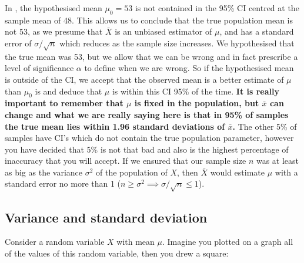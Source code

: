 In , the hypothesised mean $\mu_0=53$ is not contained in the 95\% CI centred at the sample mean of 48. This allows us to conclude that the true population mean is not 53, as we presume that $\bar{X}$ is an unbiased estimator of $\mu$, and has a standard error of $\sigma/\sqrt{n}$ which reduces as the sample size increases. We hypothesised that the true mean was 53, but we allow that we can be wrong and in fact prescribe a level of significance $\alpha$ to define when we are wrong. So if the hypothesised mean is outside of the CI, we accept that the observed mean is a better estimate of $\mu$ than $\mu_0$ is and deduce that $\mu$ is within this CI 95\% of the time. \textbf{It is really important to remember that $\mu$ is fixed in the population, but $\bar{x}$ can change and what we are really saying here is that in 95\% of samples the true mean lies within 1.96 standard deviations of $\bar{x}$.} The other 5\% of samples have CI's which do not contain the true population parameter, however you have decided that 5\% is not that bad and also is the highest percentage of inaccuracy that you will accept. If we ensured that our sample size $n$ was at least as big as the variance $\sigma^2$ of the population of $X$, then $\bar{X}$ would estimate $\mu$ with a standard error no more than 1 ($n \geq \sigma^2 \implies \sigma/\sqrt{n} \leq 1 $). 

\subsection*{Variance and standard deviation}
Consider a random variable $X$ with mean $\mu$. Imagine you plotted on a graph all of the values of this random variable, then you drew a square:


